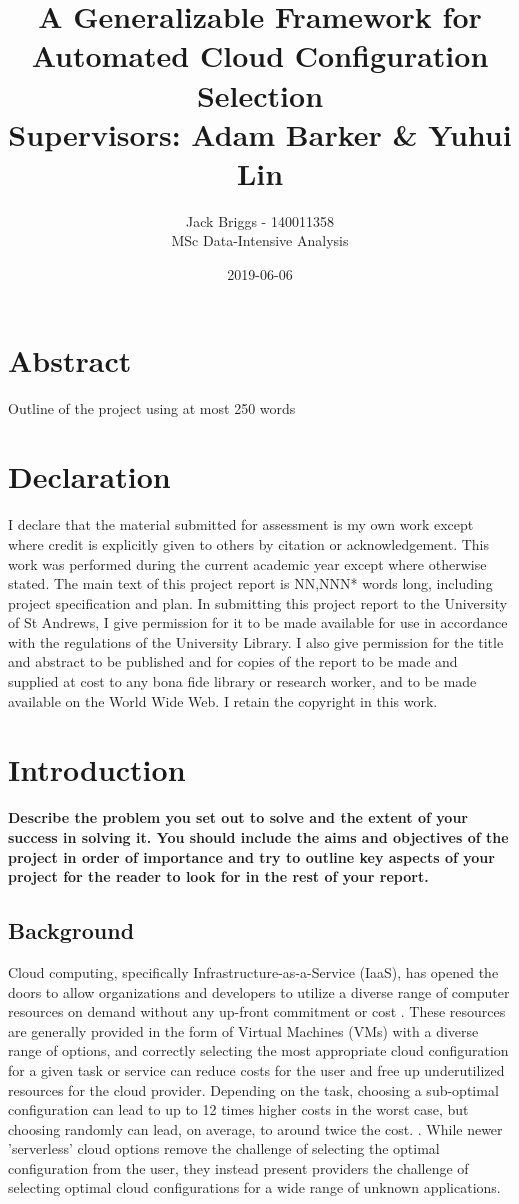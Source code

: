 \documentclass{article}
\title{\vspace{-2.0cm} A Generalizable Framework for Automated Cloud Configuration Selection \\ \vspace{0.5cm} \large Supervisors: Adam Barker \& Yuhui Lin}
\date{2019-06-06}
\author{Jack Briggs - 140011358 \\ MSc Data-Intensive Analysis}
\begin{document}
\maketitle
\newpage
\section*{Abstract}
Outline of the project using at most 250 words
\newpage
\section*{Declaration}
I declare that the material submitted for assessment
is my own work except where credit is explicitly
given to others by citation or acknowledgement. This
work was performed during the current academic year
except where otherwise stated.
The main text of this project report is NN,NNN* words
long, including project specification and plan.
In submitting this project report to the University of St
Andrews, I give permission for it to be made
available for use in accordance with the regulations of the University Library. I also give permission for the title and abstract to be published and for copies of the report to be made and supplied at cost to any bona fide library or research worker, and to be made available on the World Wide Web. I retain the copyright in this work.
\newpage
\tableofcontents
\listoffigures
\newpage
\section{Introduction}
\textbf{Describe the problem you set out to solve and the extent
of your success in solving it. You should include the aims
and objectives of the project in order of importance and
try to outline key aspects of your project for the reader to look for in the rest of your report.}
\subsection{Background}
Cloud computing, specifically Infrastructure-as-a-Service (IaaS), has opened the doors to allow organizations and developers to utilize a diverse range of computer resources on demand without any up-front commitment or cost \cite{Armbrust2009}. These resources are generally provided in the form of Virtual Machines (VMs) with a diverse range of options, and correctly selecting the most appropriate cloud configuration for a given task or service can reduce costs for the user and free up underutilized resources for the cloud provider. Depending on the task, choosing a sub-optimal configuration can lead to up to 12 times higher costs in the worst case, but choosing randomly can lead, on average, to around twice the cost. \cite{Alipourfard2017}. While newer 'serverless' cloud options remove the challenge of selecting the optimal  configuration from the user, they instead  present providers the challenge of selecting optimal cloud configurations for a wide range of unknown applications.
\end{document}
